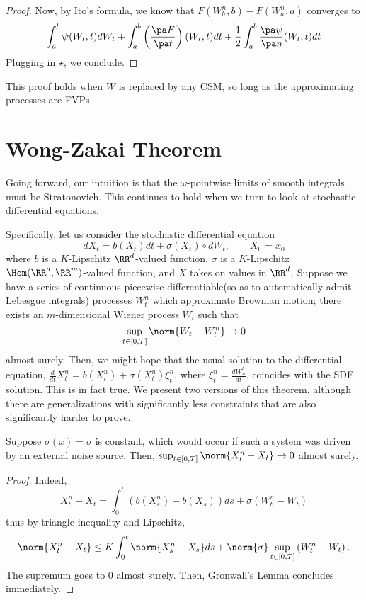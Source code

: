 \documentclass{scrartcl}
\begin{document}
\begin{proof}
Now, by Ito's formula, we know that $F(W^n_b, b) - F(W^n_a, a)$ converges to$$
\int_a^b \psi(W_t, t)dW_t + \int_a^b \left(\frac{\pa F}{\pa t}\right)(W_t, t)dt + \frac12 \int_a^b \frac{\pa \psi}{\pa \eta}(W_t,t)dt
$$
Plugging in $\star$, we conclude.

\end{proof}

This proof holds when $W$ is replaced by any CSM, so long as the approximating processes are FVPs.

\section{Wong-Zakai Theorem}
Going forward, our intuition is that the $\omega$-pointwise limits of smooth integrals must be Stratonovich. This continues to hold when we turn to look at stochastic differential equations.

Specifically, let us consider the stochastic differential equation
\[
    dX_t = b(X_t)dt + \sigma(X_t) \circ dW_t, \qquad X_0 = x_0
\]
where $b$ is a $K$-Lipschitz $\RR^d$-valued function, $\sigma$ is a $K$-Lipschitz $\Hom(\RR^d, \RR^m)$-valued function, and  $X$ takes on values in $\RR^d$. Suppose we have a series of continuous piecewise-differentiable(so as to automatically admit Lebesgue integrals) processes $W^n_t$ which approximate Brownian motion; there exists an $m$-dimensional Wiener process $W_t$ such that
\[
\sup_{t\in [0,T]} \norm{W_t - W_t^n}\to 0
\]
almost surely. Then, we might hope that the usual solution to the differential equation, $\frac{d}{dt}X^n_t = b(X^n_t) + \sigma(X^n_t)\xi^n_t$, where $\xi^n_t = \frac{d W^t_n}{dt}$, coincides with the SDE solution. This is in fact true. We present two versions of this theorem, although there are generalizations with significantly less constraints that are also significantly harder to prove.

\begin{thm}
    Suppose $\sigma(x) = \sigma$ is constant, which would occur if such a system was driven by an external noise source. Then, $\sup_{t\in [0,T]} \norm{X^n_t - X_t}\to 0$ almost surely.
\end{thm}

\begin{proof}
Indeed,$$X^n_t - X_t = \int_0^t \left(b(X^n_s) - b(X_s)\right)ds + \sigma(W^n_t - W_t)$$thus by triangle inequality and Lipschitz,$$\norm{X^n_t - X_t}\leq K\int_0^t \norm{X^n_s - X_s}ds + \norm{\sigma} \sup_{t\in [0,T]}\left(W^n_t - W_t\right).$$The supremum goes to $0$ almost surely. Then, Gronwall's Lemma concludes immediately.
\end{proof}
\end{document}

